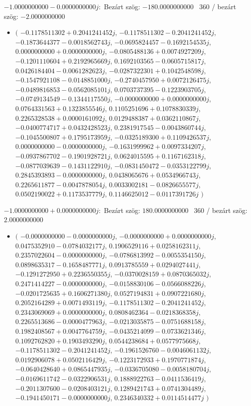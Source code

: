 \documentclass[14pt,a4paper]{article}
\begin{document}
$-1.0000000000-0.0000000000j$:\
Bezárt szög: $-180.0000000000$ \
360 / bezárt szög: $-2.0000000000$\
\begin{itemize}
\item
$\big($
$-0.1178511302+0.2041241452j$, $-0.1178511302-0.2041241452j$, $-0.1873644377-0.0018562743j$, $-0.0695824457-0.1692154535j$, $0.0000000000+0.0000000000j$, $-0.0805488136+0.0074927209j$, $-0.1201110604+0.2192965669j$, $0.1692103565-0.0605715817j$, $0.0426184404-0.0061282623j$, $-0.0287322301+0.1042548598j$, $-0.1547921108-0.0148851000j$, $-0.2740457950+0.0072126475j$, $-0.0489816853-0.0562085101j$, $0.0703737395-0.1223903705j$, $-0.0749134549-0.1344117550j$, $-0.0000000000+0.0000000000j$, $0.0764331563+0.1323855546j$, $0.1105251696+0.1078830339j$, $0.2265328538+0.0000161092j$, $0.0129488387+0.0362110867j$, $-0.0400774717+0.0432428523j$, $0.2381917545-0.0043860744j$, $-0.1045500807+0.1795173959j$, $-0.0325189300+0.1109426537j$, $0.0000000000-0.0000000000j$, $-0.1631999962+0.0097334207j$, $-0.0937867702-0.1901928721j$, $0.0624015595+0.1167162318j$, $-0.0877039639-0.1431122910j$, $-0.0831450472-0.0353122799j$, $0.2845393893-0.0000000000j$, $0.0438065676+0.0534966743j$, $0.2265611877-0.0047878054j$, $0.0033002181-0.0826655577j$, $0.0502190022+0.1173537779j$, $0.1146625012-0.0117391726j$
$\big)$
\end{itemize}
$-1.0000000000+0.0000000000j$:\
Bezárt szög: $180.0000000000$ \
360 / bezárt szög: $2.0000000000$\
\begin{itemize}
\item
$\big($
$-0.0000000000-0.0000000000j$, $-0.0000000000+0.0000000000j$, $0.0475352910-0.0784032177j$, $0.1906529116+0.0258162311j$, $0.2357022604-0.0000000000j$, $-0.0786813992-0.0055354150j$, $0.0898635317-0.1658487771j$, $0.0913785559+0.0294027441j$, $-0.1291272950+0.2236550355j$, $-0.0370028159+0.0870365032j$, $0.2471414227-0.0000000000j$, $-0.0158830106-0.0566088226j$, $-0.0201725635+0.1606271380j$, $0.0527194831+0.0907221680j$, $0.2052164289+0.0071493119j$, $-0.1178511302-0.2041241452j$, $0.2343069069+0.0000000000j$, $0.0808462364-0.0218368358j$, $0.2265513686-0.0000477963j$, $-0.0213035875-0.0751688158j$, $0.1982408567+0.0047764759j$, $-0.0435214099-0.0733621346j$, $0.1092762820+0.1903493290j$, $0.0544238684+0.0577975668j$, $-0.1178511302-0.2041241452j$, $-0.1961526760-0.0046061132j$, $0.0192906078+0.0502116429j$, $-0.1223172933+0.1970771874j$, $-0.0640428640+0.0865447935j$, $-0.0336705080-0.0058180704j$, $-0.0169611742-0.0322906531j$, $0.1888922763-0.0411536419j$, $-0.2011307600-0.0208403121j$, $0.1289421743+0.0741304489j$, $-0.1941450171-0.0000000000j$, $0.2346340332+0.0114514477j$
$\big)$
\end{itemize}
\end{document}
